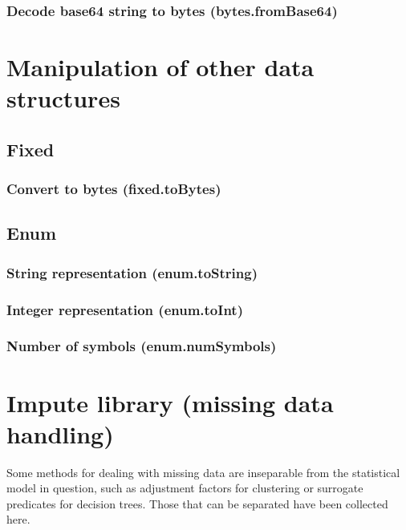 \documentclass{article}
\theoremstyle{definition}
\begin{document}
\subsubsection{Decode base64 string to bytes (bytes.fromBase64)}

\pagebreak
\section{Manipulation of other data structures}

\subsection{Fixed}

\subsubsection{Convert to bytes (fixed.toBytes)}

\subsection{Enum}

\subsubsection{String representation (enum.toString)}

\subsubsection{Integer representation (enum.toInt)}

\subsubsection{Number of symbols (enum.numSymbols)}

\pagebreak

\hypertarget{hsec:impute}{}
\section{Impute library (missing data handling)}
\label{sec:impute}

Some methods for dealing with missing data are inseparable from the statistical model in question, such as adjustment factors for clustering or surrogate predicates for decision trees.  Those that can be separated have been collected here.
\end{document}
